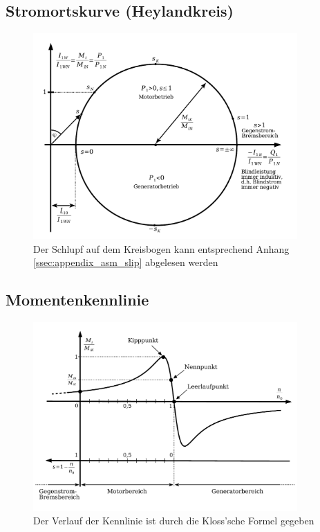 \documentclass[a4paper, 11pt]{article}
\begin{document}
\subsection*{Stromortskurve (Heylandkreis)}
\begin{figure}[H]
	\centering
	\includegraphics[width=0.9\textwidth]{img/asynchronmaschine_heylandkreis.pdf}
	\caption*{Der Schlupf auf dem Kreisbogen kann entsprechend Anhang \ref{ssec:appendix_asm_slip} abgelesen werden}
\end{figure}

\subsection*{Momentenkennlinie}
\begin{figure}[H]
	\centering
	\includegraphics[width=0.9\textwidth]{img/asynchronmaschine_kennlinie.pdf}
	\caption*{Der Verlauf der Kennlinie ist durch die Kloss'sche Formel gegeben}
\end{figure}
\end{document}
